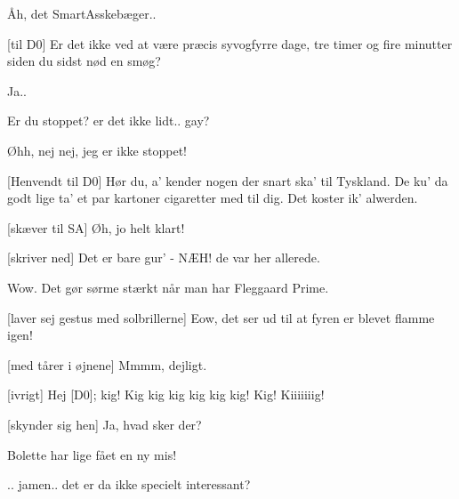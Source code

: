 \documentclass[a4paper,11pt]{article}
\begin{document}
\begin{sketch}

   Åh, det SmartAsskebæger..

  [til D0] Er det ikke ved at være præcis syvogfyrre dage, 
  tre timer og fire minutter siden du sidst nød en smøg?


   Ja..

   Er du stoppet?  er det ikke lidt.. gay?

   Øhh, nej nej, jeg er ikke stoppet!

  [Henvendt til D0] Hør du, a' kender nogen der snart ska' til Tyskland.
  De ku' da godt lige ta' et par kartoner cigaretter med til dig. Det koster ik' alwerden.

  [skæver til SA] Øh, jo helt klart!

  [skriver ned] Det er bare gur' -  NÆH!  de var her allerede.

   Wow. Det gør sørme stærkt når man har Fleggaard Prime.

  
  [laver sej gestus med solbrillerne] Eow, det ser ud til at fyren er
  blevet flamme igen!


  
  [med tårer i øjnene] Mmmm, dejligt.


  [ivrigt] Hej [D0]; kig! Kig kig kig kig kig kig! Kig! Kiiiiiiig!

  [skynder sig hen] Ja, hvad sker der?

   Bolette har lige fået en ny mis!


   .. jamen.. det er da ikke specielt interessant?


\end{sketch}
\end{document}

